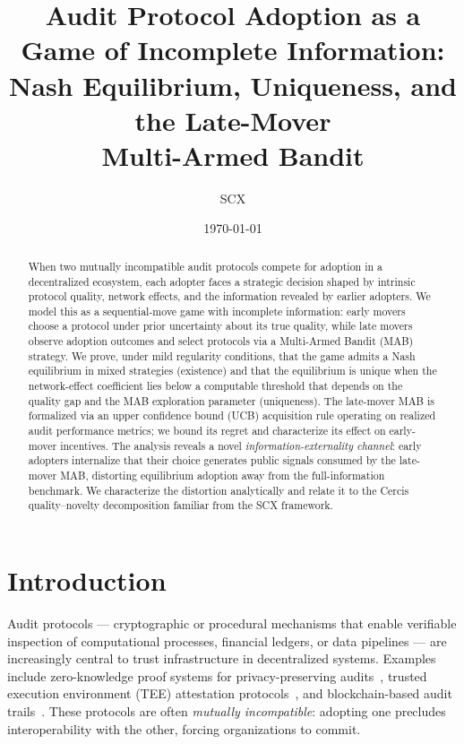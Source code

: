 \documentclass[12pt,a4paper]{article}
\title{\bfseries Audit Protocol Adoption as a Game of Incomplete Information:\\
Nash Equilibrium, Uniqueness, and the Late-Mover\\
Multi-Armed Bandit}
\author{SCX}
\date{\today}
\begin{document}
\maketitle

\begin{abstract}
When two mutually incompatible audit protocols compete for adoption in a
decentralized ecosystem, each adopter faces a strategic decision shaped by
intrinsic protocol quality, network effects, and the information revealed
by earlier adopters.  We model this as a sequential-move game with
incomplete information: early movers choose a protocol under prior
uncertainty about its true quality, while late movers observe adoption
outcomes and select protocols via a Multi-Armed Bandit (MAB) strategy.
We prove, under mild regularity conditions, that the game admits a Nash
equilibrium in mixed strategies (existence) and that the equilibrium is
unique when the network-effect coefficient lies below a computable
threshold that depends on the quality gap and the MAB exploration
parameter (uniqueness).  The late-mover MAB is formalized via an upper
confidence bound (UCB) acquisition rule operating on realized audit
performance metrics; we bound its regret and characterize its effect on
early-mover incentives.  The analysis reveals a novel
\emph{information-externality channel}: early adopters internalize that
their choice generates public signals consumed by the late-mover MAB,
distorting equilibrium adoption away from the full-information benchmark.
We characterize the distortion analytically and relate it to the Cercis
quality--novelty decomposition familiar from the \textsf{SCX} framework.
\end{abstract}

\section{Introduction}

Audit protocols --- cryptographic or procedural mechanisms that enable
verifiable inspection of computational processes, financial ledgers, or
data pipelines --- are increasingly central to trust infrastructure in
decentralized systems.  Examples include zero-knowledge proof systems for
privacy-preserving audits~\citep{goldwasser1989knowledge}, trusted execution
environment (TEE) attestation protocols~\citep{costan2016intel}, and
blockchain-based audit trails~\citep{nakamoto2008bitcoin}.  These protocols
are often \emph{mutually incompatible}: adopting one precludes interoperability
with the other, forcing organizations to commit.
\end{document}
